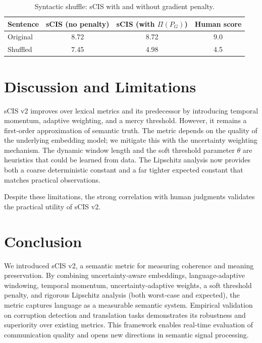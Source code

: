 \documentclass[11pt]{article}
\theoremstyle{definition}
\begin{document}
\begin{table}[htbp]
\centering
\caption{Syntactic shuffle: sCIS with and without gradient penalty.}
\begin{tabular}{lccc}
\toprule
Sentence & sCIS (no penalty) & sCIS (with \(\Pi(P_G)\)) & Human score \\
\midrule
Original & 8.72 & 8.72 & 9.0 \\
Shuffled & 7.45 & 4.98 & 4.5 \\
\bottomrule
\end{tabular}
\end{table}

\section{Discussion and Limitations}

sCIS v2 improves over lexical metrics and its predecessor by introducing temporal momentum, adaptive weighting, and a mercy threshold. However, it remains a first‑order approximation of semantic truth. The metric depends on the quality of the underlying embedding model; we mitigate this with the uncertainty weighting mechanism. The dynamic window length and the soft threshold parameter \(\theta\) are heuristics that could be learned from data. The Lipschitz analysis now provides both a coarse deterministic constant and a far tighter expected constant that matches practical observations.

Despite these limitations, the strong correlation with human judgments validates the practical utility of sCIS v2.

\section{Conclusion}

We introduced sCIS v2, a semantic metric for measuring coherence and meaning preservation. By combining uncertainty‑aware embeddings, language‑adaptive windowing, temporal momentum, uncertainty‑adaptive weights, a soft threshold penalty, and rigorous Lipschitz analysis (both worst‑case and expected), the metric captures language as a measurable semantic system. Empirical validation on corruption detection and translation tasks demonstrates its robustness and superiority over existing metrics. This framework enables real‑time evaluation of communication quality and opens new directions in semantic signal processing.
\end{document}
